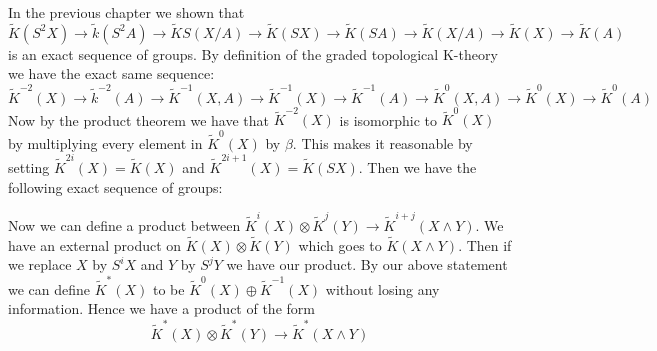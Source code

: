 \documentclass[../Thesis.tex]{subfiles}
\begin{document}
In the previous chapter we shown that 
\begin{equation}
\tilde{K}(S^2X) \rightarrow \tilde{k}(S^2A) \rightarrow \tilde{K} S(X/A) \rightarrow \tilde{K}(SX) \rightarrow \tilde{K}(SA) \rightarrow \tilde{K}(X/A) \rightarrow \tilde{K}(X) \rightarrow \tilde{K}(A)
 \end{equation}
is an exact sequence of groups. By definition of the graded topological K-theory we have the exact same sequence:
\begin{equation}
\tilde{K}^{-2}(X) \rightarrow \tilde{k}^{-2}(A) \rightarrow \tilde{K}^{-1} (X,A) \rightarrow \tilde{K}^{-1}(X) \rightarrow \tilde{K}^{-1}(A) \rightarrow \tilde{K}^0(X,A) \rightarrow \tilde{K}^0(X) \rightarrow \tilde{K}^0(A)
 \end{equation}
Now by the product theorem we have that $\tilde{K}^{-2}(X)$ is isomorphic to $\tilde{K}^0(X)$ by multiplying every element in $\tilde{K}^0(X)$ by $\beta$. This makes it reasonable by setting $\tilde{K}^{2i}(X) = \tilde{K}(X)$ and $\tilde{K}^{2i +1}(X) = \tilde{K}(SX)$. Then we have the following exact sequence of groups:
\begin{center}
\end{center}
Now we can define a product between $\tilde{K}^{i}(X) \otimes \tilde{K}^{j}(Y) \rightarrow \tilde{K}^{i + j}(X \wedge Y)$. We have an external product on $\tilde{K}(X) \otimes \tilde{K}(Y)$ which goes to $\tilde{K}(X \wedge Y)$. Then if we replace $X$ by $S^iX$ and $Y$ by $S^jY$ we have our product. By our above statement  we can define $\tilde{K}^*(X)$ to be $\tilde{K}^0(X) \oplus \tilde{K}^{-1}(X)$ without losing any information. Hence we have a product of the form
$$\tilde{K}^*(X) \otimes \tilde{K}^*(Y) \rightarrow \tilde{K}^*(X \wedge Y)$$
\end{document}
